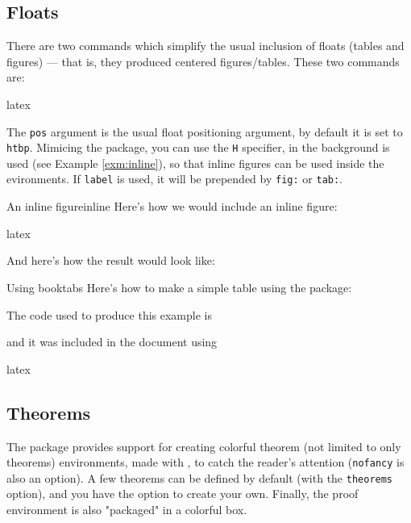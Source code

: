 \documentclass{notes}
\begin{document}
\subsection{Floats}

There are two commands which simplify the usual inclusion of floats (tables and figures) --- that is, they produced centered figures/tables. These two commands are:

\begin{tminted}{latex}
\end{tminted}

The \texttt{pos} argument is the usual float positioning argument, by default it is set to \texttt{htbp}. Mimicing the  package, you can use the \texttt{H} specifier, in the background  is used (see Example \ref{exm:inline}), so that inline figures can be used inside the  evironments. If \texttt{label} is used, it will be prepended by \texttt{fig:} or \texttt{tab:}.

\begin{exm}{An inline figure}{inline}
Here's how we would include an inline figure:
\begin{tminted}{latex}
\end{tminted}

And here's how the result would look like:
\end{exm}

\begin{exm}{Using }{booktabs}
Here's how to make a simple table using the  package:


The code used to produce this example is

and it was included in the document using
\begin{tminted}{latex}
\end{tminted}
\end{exm}

\subsection{Theorems} \label{theorems}

The  package provides support for creating colorful theorem (not limited to only theorems) environments, made with , to catch the reader's attention (\texttt{nofancy} is also an option). A few theorems can be defined by default (with the \texttt{theorems} option), and you have the option to create your own. Finally, the proof environment is also "packaged" in a colorful box.
\end{document}
